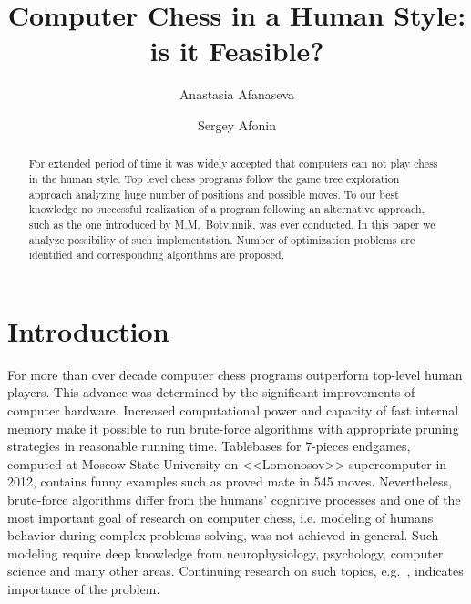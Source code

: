 \documentclass{llncs}
\author{Anastasia Afanaseva \and Sergey Afonin}
\institute{Moscow State University, Russian Federation\\
}%
\title{Computer Chess in a Human Style: is it Feasible?}
\begin{document}
\maketitle

\begin{abstract}
  For extended period of time it was widely accepted that
  computers can not play chess in the human style. Top level chess
  programs follow the game tree exploration approach analyzing
  huge number of positions and possible moves. To our best
  knowledge no successful realization of a program following an
  alternative approach, such as the one introduced by M.M.~Botvinnik,
  was ever conducted.
  In this paper we analyze possibility of such implementation. Number
  of optimization problems are identified and corresponding algorithms
  are proposed.

\end{abstract}

\section{Introduction}
For more than over decade computer chess programs outperform top-level
human players. This advance was determined by the significant
improvements of computer hardware. Increased computational power and
capacity of fast internal memory make it possible to run brute-force
algorithms with appropriate pruning strategies in reasonable running
time. Tablebases for 7-pieces endgames, computed at Moscow State
University on <<Lomonosov>> supercomputer in 2012, contains funny
examples such as proved mate in 545 moves. Nevertheless, brute-force
algorithms differ from the humans' cognitive processes and one of the
most important goal of research on computer chess, i.e. modeling of
humans behavior during complex problems solving, was not achieved in
general. Such modeling require deep knowledge from neurophysiology,
psychology, computer science and many other areas. Continuing research
on such topics, e.g.~\cite{reingold:2005:perception,CAMPITELLI2007}, indicates
importance of the problem.
\end{document}
